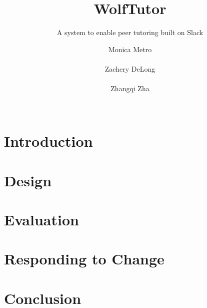 \documentclass{sig-alternate-05-2015}
\begin{document}
\title{WolfTutor
}
\subtitle{A system to enable peer tutoring built on Slack
}

\author{
  \alignauthor
  {Monica Metro}\\
  \\
  \alignauthor
  {Zachery DeLong}\\
  \\
  \alignauthor 
  {Zhangqi Zha} \\
  \\
}
\maketitle



\section{Introduction}
\label{sec:intro}


\section{Design}
\label{sec:design}


\section{Evaluation}
\label{sec:evaluation}

\section{Responding to Change}
\label{sec:responding-change}


\section{Conclusion}
\label{sec:conclusion}








\end{document}
